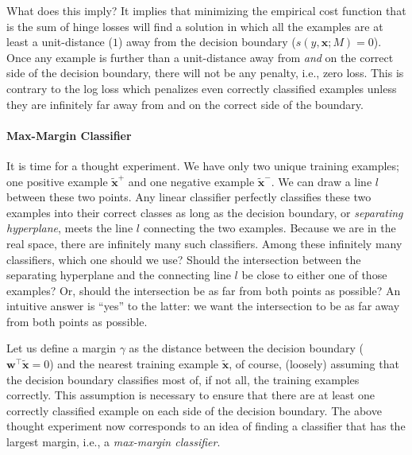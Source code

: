 \documentclass{report}
\newcommand{\vect}[1]{\mathbf{#1}}
\newcommand{\vx}[0]{\vect{x}}
\newcommand{\vw}[0]{\vect{w}}
\begin{document}
What does this imply? It implies that minimizing the empirical cost function
that is the sum of hinge losses will find a solution in which all the examples
are at least a unit-distance ($1$) away from the decision boundary ($s(y, \vx;
M) = 0$). Once any example is further than a unit-distance away from  {\it and}
on the correct side of the decision boundary, there will not be any penalty, i.e.,
zero loss. This is contrary to the log loss which penalizes even correctly
classified examples unless they are infinitely far away from and on the correct
side of the boundary.

\paragraph{Max-Margin Classifier}

It is time for a thought experiment. We have only two unique training examples;
one positive example $\tilde{\vx}^+$ and one negative example $\tilde{\vx}^-$.
We can draw a line $l$ between these two points.  Any linear classifier
perfectly classifies these two examples into their correct classes as long as
the decision boundary, or {\it separating hyperplane}, meets the line $l$
connecting the two examples.  Because we are in the real space, there are
infinitely many such classifiers.  Among these infinitely many classifiers,
which one should we use? Should the intersection between the separating
hyperplane and the connecting line $l$ be close to either one of those examples?
Or, should the intersection be as far from both points as possible? An intuitive
answer is ``yes'' to the latter: we want the intersection to be as far away from
both points as possible. 

Let us define a margin $\gamma$ as the distance between the decision boundary
($\vw^\top \tilde{\vx} = 0$) and the nearest training example $\tilde{\vx}$, of
course, (loosely) assuming that the decision boundary classifies most of, if not
all, the training examples correctly. This assumption is necessary to ensure
that there are at least one correctly classified example on each side of the
decision boundary.  The above thought experiment now corresponds to an idea of
finding a classifier that has the largest margin, i.e., a {\it max-margin
classifier}. 
\end{document}
